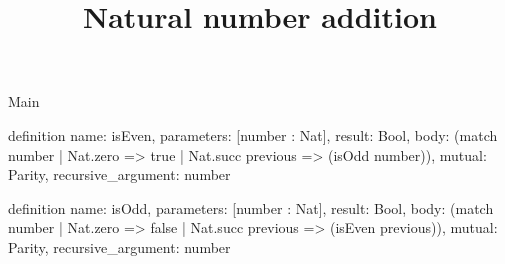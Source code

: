 \begin{lexlean}{Main}
\title{Natural number addition}
\begin{semanticmodule}
definition{
  name: isEven,
  parameters: [number : Nat],
  result: Bool,
  body: (match number | Nat.zero => true | Nat.succ previous => (isOdd number)),
  mutual: Parity,
  recursive_argument: number
}

definition{
  name: isOdd,
  parameters: [number : Nat],
  result: Bool,
  body: (match number | Nat.zero => false | Nat.succ previous => (isEven previous)),
  mutual: Parity,
  recursive_argument: number
}
\end{semanticmodule}
\end{lexlean}
